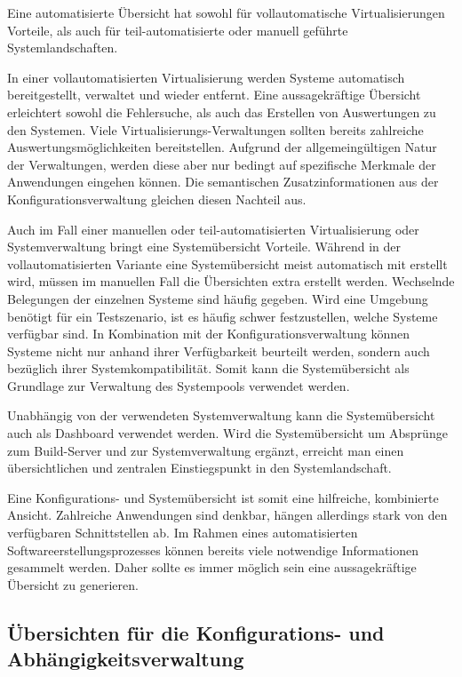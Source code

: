 Eine automatisierte Übersicht hat sowohl für vollautomatische Virtualisierungen Vorteile, als auch für teil-automatisierte oder manuell geführte Systemlandschaften.

In einer vollautomatisierten Virtualisierung werden Systeme automatisch bereitgestellt, verwaltet und wieder entfernt. Eine aussagekräftige Übersicht erleichtert sowohl die Fehlersuche, als auch das Erstellen von Auswertungen zu den Systemen. Viele Virtualisierungs-Verwaltungen sollten bereits zahlreiche Auswertungsmöglichkeiten bereitstellen. Aufgrund der allgemeingültigen Natur der Verwaltungen, werden diese aber nur bedingt auf spezifische Merkmale der Anwendungen eingehen können. Die semantischen Zusatzinformationen aus der Konfigurationsverwaltung gleichen diesen Nachteil aus.

Auch im Fall einer manuellen oder teil-automatisierten Virtualisierung oder Systemverwaltung bringt eine Systemübersicht Vorteile. Während in der vollautomatisierten Variante eine Systemübersicht meist automatisch mit erstellt wird, müssen im manuellen Fall die Übersichten extra erstellt werden. Wechselnde Belegungen der einzelnen Systeme sind häufig gegeben. Wird eine Umgebung benötigt für ein Testszenario, ist es häufig schwer festzustellen, welche Systeme verfügbar sind. In Kombination mit der Konfigurationsverwaltung können Systeme nicht nur anhand ihrer Verfügbarkeit beurteilt werden, sondern auch bezüglich ihrer Systemkompatibilität. Somit kann die Systemübersicht als Grundlage zur Verwaltung des Systempools verwendet werden.

Unabhängig von der verwendeten Systemverwaltung kann die Systemübersicht auch als Dashboard verwendet werden. Wird die Systemübersicht um Absprünge zum Build-Server und zur Systemverwaltung ergänzt, erreicht man einen übersichtlichen und zentralen Einstiegspunkt in den Systemlandschaft.

Eine Konfigurations- und Systemübersicht ist somit eine hilfreiche, kombinierte Ansicht. Zahlreiche Anwendungen sind denkbar, hängen allerdings stark von den verfügbaren Schnittstellen ab. Im Rahmen eines automatisierten Softwareerstellungsprozesses können bereits viele notwendige Informationen gesammelt werden. Daher sollte es immer möglich sein eine aussagekräftige Übersicht zu generieren.

\subsection{Übersichten für die Konfigurations- und Abhängigkeitsverwaltung}

